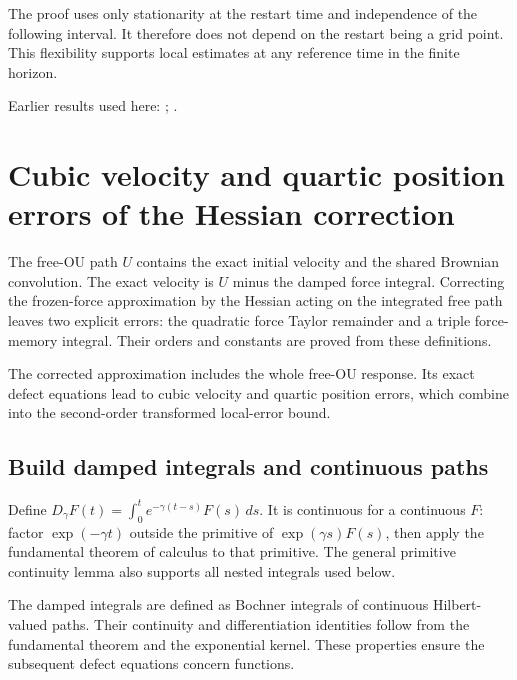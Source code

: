 \documentclass[11pt,a4paper]{report}
\begin{document}
The proof uses only stationarity at the restart time and independence of the following interval. It therefore does not depend on the restart being a grid point. This flexibility supports local estimates at any reference time in the finite horizon.



Earlier results used here: \cite[Section~3.17.1]{LangevinLean2026ULASC}; \cite[Section~3.26.3]{LangevinLean2026ULASC}.
\section{\texorpdfstring{Cubic velocity and quartic position errors of the Hessian correction}{Cubic velocity and quartic position errors of the Hessian correction}}
\label{proof-module-KineticLangevin-SecondOrderLocal-lean}


The free-OU path \(U\) contains the exact initial velocity and the shared Brownian convolution. The exact velocity is \(U\) minus the damped force integral. Correcting the frozen-force approximation by the Hessian acting on the integrated free path leaves two explicit errors: the quadratic force Taylor remainder and a triple force-memory integral. Their orders and constants are proved from these definitions.



The corrected approximation includes the whole free-OU response. Its exact defect equations lead to cubic velocity and quartic position errors, which combine into the second-order transformed local-error bound.

\subsection{\texorpdfstring{Build damped integrals and continuous paths}{Build damped integrals and continuous paths}}
\label{report-step-KineticLangevin-SecondOrderLocal-lean-1}


Define \(D_\gamma F(t)=\int_0^te^{-\gamma(t-s)}F(s)\,ds\). It is continuous for a continuous \(F\): factor \(\exp(-\gamma t)\) outside the primitive of \(\exp(\gamma s)F(s)\), then apply the fundamental theorem of calculus to that primitive. The general primitive continuity lemma also supports all nested integrals used below.



The damped integrals are defined as Bochner integrals of continuous Hilbert-valued paths. Their continuity and differentiation identities follow from the fundamental theorem and the exponential kernel. These properties ensure the subsequent defect equations concern functions.
\end{document}
